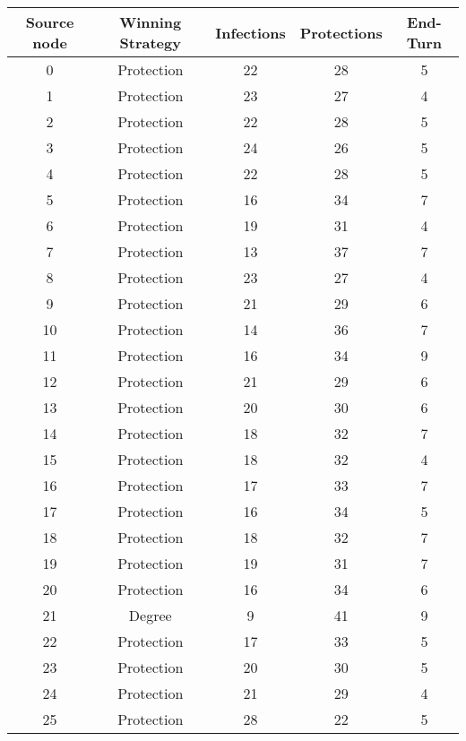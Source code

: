 \documentclass[results.tex]{subfiles}
\begin{document}
\begin{center}
  \begin{tabular}{| c || c | c | c | c |}
    \hline
    {\bfseries Source node} & {\bfseries Winning Strategy} & {\bfseries Infections} & {\bfseries Protections} & {\bfseries End-Turn} \\  %
    \hline\hline
    0 & Protection & 22 & 28 & 5 \\ 
    \hline
    1 & Protection & 23 & 27 & 4 \\ 
    \hline
    2 & Protection & 22 & 28 & 5 \\ 
    \hline
    3 & Protection & 24 & 26 & 5 \\ 
    \hline
    4 & Protection & 22 & 28 & 5 \\ 
    \hline
    5 & Protection & 16 & 34 & 7 \\ 
    \hline
    6 & Protection & 19 & 31 & 4 \\ 
    \hline
    7 & Protection & 13 & 37 & 7 \\ 
    \hline
    8 & Protection & 23 & 27 & 4 \\ 
    \hline
    9 & Protection & 21 & 29 & 6 \\ 
    \hline
    10 & Protection & 14 & 36 & 7 \\ 
    \hline
    11 & Protection & 16 & 34 & 9 \\ 
    \hline
    12 & Protection & 21 & 29 & 6 \\ 
    \hline
    13 & Protection & 20 & 30 & 6 \\ 
    \hline
    14 & Protection & 18 & 32 & 7 \\ 
    \hline
    15 & Protection & 18 & 32 & 4 \\ 
    \hline
    16 & Protection & 17 & 33 & 7 \\ 
    \hline
    17 & Protection & 16 & 34 & 5 \\ 
    \hline
    18 & Protection & 18 & 32 & 7 \\ 
    \hline
    19 & Protection & 19 & 31 & 7 \\ 
    \hline
    20 & Protection & 16 & 34 & 6 \\ 
    \hline
    21 & Degree & 9 & 41 & 9 \\ 
    \hline
    22 & Protection & 17 & 33 & 5 \\ 
    \hline
    23 & Protection & 20 & 30 & 5 \\ 
    \hline
    24 & Protection & 21 & 29 & 4 \\ 
    \hline
    25 & Protection & 28 & 22 & 5 \\ 

\end{tabular}
\end{center}
\end{document}
